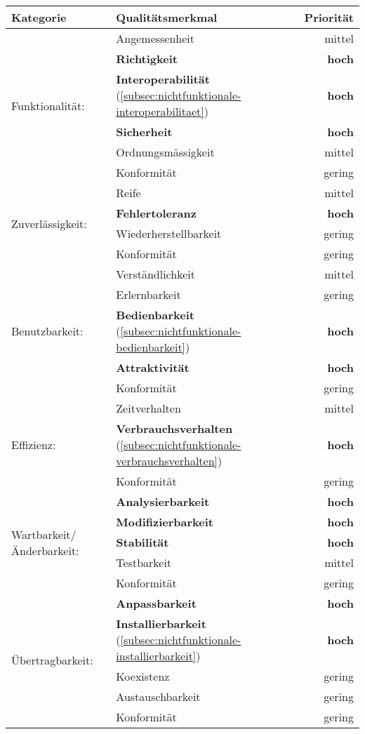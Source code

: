\begin{minipage}{\linewidth}
	\centering
	\begin{tabular}{llr}
		\hline
		Kategorie & Qualitätsmerkmal & Priorität \\
		\hline
		\multirow{6}{*}{Funktionalität:} & Angemessenheit & mittel \\
		 & \textbf{Richtigkeit} & \textbf{hoch} \\
		 & \textbf{Interoperabilität}
		  (\ref{subsec:nichtfunktionale-interoperabilitaet}) & \textbf{hoch} \\
		 & \textbf{Sicherheit} & \textbf{hoch} \\
		 & Ordnungsmässigkeit & mittel \\
		 & Konformität & gering \\
		\hline
		\multirow{4}{*}{Zuverlässigkeit:} & Reife & mittel \\
		 & \textbf{Fehlertoleranz} & \textbf{hoch} \\
		 & Wiederherstellbarkeit & gering \\
		 & Konformität & gering \\
		\hline
		\multirow{5}{*}{Benutzbarkeit:} & Verständlichkeit & mittel \\
		 & Erlernbarkeit & gering \\
		 & \textbf{Bedienbarkeit}
		  (\ref{subsec:nichtfunktionale-bedienbarkeit}) & \textbf{hoch} \\
		 & \textbf{Attraktivität} & \textbf{hoch} \\
		 & Konformität & gering \\
		\hline
		\multirow{3}{*}{Effizienz:} & Zeitverhalten & mittel \\
		 & \textbf{Verbrauchsverhalten}
		  (\ref{subsec:nichtfunktionale-verbrauchsverhalten}) & \textbf{hoch} \\
		 & Konformität & gering \\
		\hline
		\multirow{5}{*}{Wartbarkeit/Änderbarkeit:} & \textbf{Analysierbarkeit}
		 & \textbf{hoch} \\
		 & \textbf{Modifizierbarkeit} & \textbf{hoch} \\
		 & \textbf{Stabilität} & \textbf{hoch} \\
		 & Testbarkeit & mittel \\
		 & Konformität & gering \\
		\hline
		\multirow{5}{*}{Übertragbarkeit:} & \textbf{Anpassbarkeit}
		 & \textbf{hoch} \\
		 & \textbf{Installierbarkeit}
		  (\ref{subsec:nichtfunktionale-installierbarkeit}) & \textbf{hoch} \\
		 & Koexistenz & gering \\
		 & Austauschbarkeit & gering \\
		 & Konformität & gering \\
		\hline
	\end{tabular}
	\label{tbl:softwarequalitaet}
\end{minipage}
\newpage


\newpage

\newpage

\newpage

